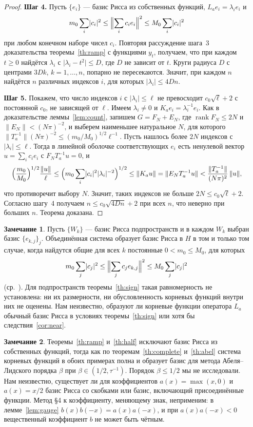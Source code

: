 \documentclass[12pt,a4paper]{article}
\theoremstyle{definition}
\newtheorem{remark}{Замечание}
\newcommand{\step}[1]{\smallskip\noindent\textbf{Шаг #1.}}
\newcommand{\norm}[1]{\lVert#1\rVert}
\newcommand{\abs}[1]{\lvert#1\rvert}
\begin{document}
\begin{proof}
\step{4} Пусть $\{e_i\}$ --- базис Рисса из собственных функций, $L_ae_i=\lambda_ie_i$ и
\[
 m_0\sum_i\abs{c_i}^2\le\Bigl\lVert\sum_ic_ie_i\Bigr\rVert^2\le M_0\sum_i\abs{c_i}^2
\]
при любом конечном наборе чисел $c_i$. Повторяя рассуждение шага~3 доказательства
теоремы~\ref{th:ramp} с функциями $y_t$, получаем, что при каждом $t\ge0$ найдётся
$\lambda_i$ с $\abs{\lambda_i-t^2}\le D$, где $D$ не зависит от $t$.
Круги радиуса $D$ с центрами $3Dk$, $k=1,\dots,n$, попарно не пересекаются. Значит, при
каждом $n$ найдётся $n$ различных индексов $i$, для которых $\abs{\lambda_i}\le4Dn$.

\step{5} Покажем, что число индексов $i$ с $\abs{\lambda_i}\le\ell$ не превосходит
$c_0\sqrt\ell+2$ с постоянной $c_0$, не зависящей от $\ell$. Имеем $\lambda_i\ne0$ и
$K_ae_i=\lambda_i^{-1}e_i$. Как в доказательстве леммы~\ref{lem:count}, запишем
$G=F_N+E_N$, где $\operatorname{rank}F_N\le2N$ и $\norm{E_N}<(N\pi)^{-2}$, и выберем
наименьшее натуральное $N$, для которого
$\norm{T_a^{-1}}(N\pi)^{-2}\le(m_0/M_0)^{1/2}\ell^{-1}$. Пусть нашлось более $2N$ индексов
с $\abs{\lambda_i}\le\ell$. Тогда в линейной оболочке соответствующих $e_i$ есть
ненулевой вектор $u=\sum_ic_ie_i$ с $F_NT_a^{-1}u=0$, и
\[
 \Bigl(\frac{m_0}{M_0}\Bigr)^{1/2}\frac{\norm u}{\ell}\le
 \Bigl(m_0\sum_i\abs{c_i}^2\abs{\lambda_i}^{-2}\Bigr)^{1/2}\le\norm{K_au}
 =\norm{E_NT_a^{-1}u}<\frac{\norm{T_a^{-1}}}{(N\pi)^2}\,\norm u ,
\]
что противоречит выбору $N$. Значит, таких индексов не больше $2N\le c_0\sqrt\ell+2$.
Согласно шагу~4 получаем $n\le c_0\sqrt{4Dn}+2$ при всех $n$, что неверно при больших $n$.
Теорема доказана.
\end{proof}

\begin{remark}\label{rem:brackets}
Пусть $\{W_k\}$ --- базис Рисса подпространств и в каждом $W_k$ выбран базис
$\{e_{k,j}\}_j$. Объединённая система образует базис Рисса в $H$ в том и только том
случае, когда найдутся общие для всех $k$ постоянные $0<m_0\le M_0$, для которых
\[
 m_0\sum_j\abs{c_j}^2\le\Bigl\lVert\sum_jc_je_{k,j}\Bigr\rVert^2\le M_0\sum_j\abs{c_j}^2
\]
(ср.~\cite[предложение~3.2]{Wyss}). Для подпространств теоремы~\ref{th:sign} такая
равномерность не установлена: ни их размерности, ни обусловленность корневых функций
внутри них не оценены. Нам неизвестно, образуют ли корневые функции оператора $L_a$
обычный базис Рисса в условиях теоремы~\ref{th:sign} или хотя бы
следствия~\ref{cor:near}.
\end{remark}

\begin{remark}\label{rem:open}
Теоремы~\ref{th:ramp} и~\ref{th:half} исключают базис Рисса из собственных функций,
тогда как по теоремам~\ref{th:complete} и~\ref{th:abel} система корневых функций в
обоих примерах полна и образует базис для метода Абеля--Лидского порядка $\beta$ при
$\beta\in(1/2,\tau^{-1})$. Порядок $\beta\le1/2$ мы не исследовали. Нам неизвестно, существует ли для коэффициентов $a(x)=\max(x,0)$ и $a(x)=x/2$ базис
Рисса со скобками или базис, включающий присоединённые функции. Метод \S4 к
коэффициенту, меняющему знак, неприменим: в лемме~\ref{lem:gauge}
$b(x)b(-x)=a(x)a(-x)$, и при $a(x)a(-x)<0$ вещественный коэффициент $b$ не может быть
чётным.
\end{remark}
\end{document}
